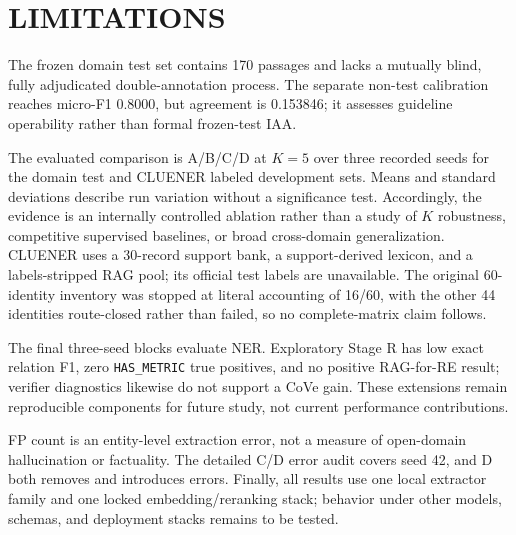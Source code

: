 \section{LIMITATIONS}

The frozen domain test set contains 170 passages and lacks a mutually blind,
fully adjudicated double-annotation process. The separate non-test calibration
reaches micro-F1 0.8000, but  agreement is 0.153846;
it assesses guideline operability rather than formal frozen-test IAA.

The evaluated comparison is A/B/C/D at $K=5$ over three recorded seeds for the
domain test and CLUENER labeled development sets. Means and standard deviations
describe run variation without a significance test. Accordingly, the evidence
is an internally controlled ablation rather than a study of $K$ robustness,
competitive supervised baselines, or broad cross-domain generalization. CLUENER uses a
30-record support bank, a support-derived lexicon, and a labels-stripped RAG
pool; its official test labels are unavailable. The original 60-identity
inventory was stopped at literal accounting of 16/60, with the other 44
identities route-closed rather than failed, so no complete-matrix claim follows.

The final three-seed blocks evaluate NER. Exploratory Stage R has low exact
relation F1, zero \texttt{HAS\_METRIC} true positives, and no positive RAG-for-RE
result; verifier diagnostics likewise do not support a CoVe gain. These
extensions remain reproducible components for future study, not current
performance contributions.

FP count is an entity-level extraction error, not a measure of open-domain
hallucination or factuality. The detailed C/D error audit covers seed 42, and D
both removes and introduces errors. Finally, all results use one local extractor
family and one locked embedding/reranking stack; behavior under other models,
schemas, and deployment stacks remains to be tested.
